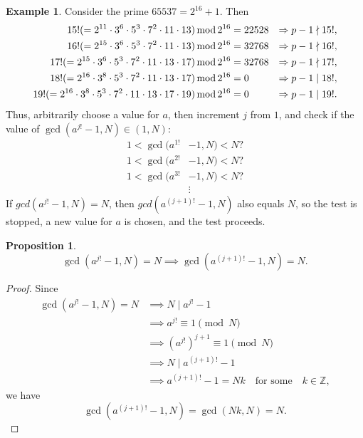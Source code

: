 \documentclass[12pt,openany]{book}
\newtheorem{proposition}[theorem]{Proposition}
\theoremstyle{definition}
\newtheorem{example}{Example}[chapter]
\newcommand{\Z}{\mathbb{Z}}
\newcommand{\of}[1]{\left( #1 \right)}
\renewcommand{\mod}{\operatorname{\textnormal{mod}}}
\begin{document}
	\begin{example}
		Consider the prime $65537=2^{16}+1$. Then \begin{align*}
		15!(=2^{11}\cdot 3^6\cdot 5^3\cdot 7^2\cdot 11\cdot 13)\mod 2^{16} &= 22528&\Rightarrow p-1\nmid 15!,\\
		16!(=2^{15}\cdot 3^6\cdot 5^3\cdot 7^2\cdot 11\cdot 13)\mod 2^{16} &= 32768&\Rightarrow p-1\nmid 16!,\\
		17!(=2^{15}\cdot 3^6\cdot 5^3\cdot 7^2\cdot 11\cdot 13\cdot 17)\mod 2^{16} &= 32768&\Rightarrow p-1\nmid 17!,\\
		18!(=2^{16}\cdot 3^8\cdot 5^3\cdot 7^2\cdot 11\cdot 13\cdot 17)\mod 2^{16} &= 0&\Rightarrow p-1\mid 18!,\\
		19!(=2^{16}\cdot 3^8\cdot 5^3\cdot 7^2\cdot 11\cdot 13\cdot 17\cdot 19)\mod 2^{16} &= 0&\Rightarrow p-1\mid 19!.
		\end{align*} Thus, arbitrarily choose a value for $a$, then increment $j$ from $1$, and check if the value of $\gcd\of{a^{j!}-1,N}\in(1,N)$:
		\begin{align*}
		1<\gcd(a^{1!}&-1,N)<N?\\
		1<\gcd(a^{2!}&-1,N)<N?\\
		1<\gcd(a^{3!}&-1,N)<N?\\
		&\vdots
		\end{align*}
		If $gcd(a^{j!} - 1, N) = N$, then $gcd(a^{(j+1)!} - 1, N)$ also equals $N$, so the test is stopped, a new value for $a$ is chosen, and the test proceeds.
	\end{example}
	\vspace{8pt}
	\begin{tcolorbox}[colback=white,colframe=procolor,arc=5pt,title={\color{white}\bf Existence of the Multiple of $p-1$}]
		\begin{proposition}
			\[
			\gcd\of{a^{j!}-1,N}=N\implies\gcd\of{a^{\of{j+1}!}-1,N}=N.
			\]
		\end{proposition}
	\end{tcolorbox}
	\begin{proof}
		Since \begin{align*}
		\gcd\of{a^{j!}-1,N}=N&\implies N\mid a^{j!}-1\\
		&\implies a^{j!}\equiv 1\pmod{N}\\
		&\implies \of{a^{j!}}^{j+1}\equiv 1\pmod{N}\\
		&\implies N\mid a^{\of{j+1}!}-1\\
		&\implies a^{\of{j+1}!}-1=Nk\quad \text{for some}\quad k\in\Z,
		\end{align*} we have \[
		\gcd\of{a^{\of{j+1}!}-1,N}=\gcd\of{Nk,N}=N.
		\]
	\end{proof}
	
\end{document}
